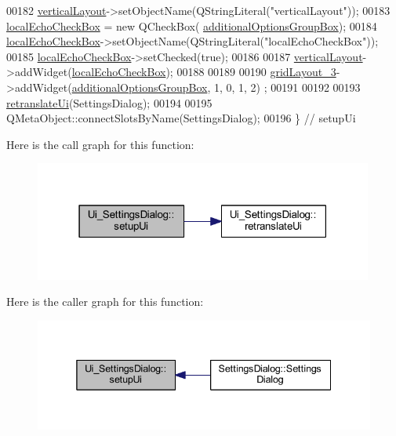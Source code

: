 \begin{DoxyCode}
00182         \hyperlink{a00029_aad19d26806d7e14548233852ac97c26f}{verticalLayout}->setObjectName(QStringLiteral(\textcolor{stringliteral}{"verticalLayout"}));
00183         \hyperlink{a00029_a4cef19b8232e266ba202152ade600263}{localEchoCheckBox} = \textcolor{keyword}{new} QCheckBox(
      \hyperlink{a00029_a996d0cf4818dae895375cb43b996e0dc}{additionalOptionsGroupBox});
00184         \hyperlink{a00029_a4cef19b8232e266ba202152ade600263}{localEchoCheckBox}->setObjectName(QStringLiteral(\textcolor{stringliteral}{"localEchoCheckBox"}));
00185         \hyperlink{a00029_a4cef19b8232e266ba202152ade600263}{localEchoCheckBox}->setChecked(\textcolor{keyword}{true});
00186 
00187         \hyperlink{a00029_aad19d26806d7e14548233852ac97c26f}{verticalLayout}->addWidget(\hyperlink{a00029_a4cef19b8232e266ba202152ade600263}{localEchoCheckBox});
00188 
00189 
00190         \hyperlink{a00029_a2cc53955b73f22f0cfcf508da4654b16}{gridLayout\_3}->addWidget(\hyperlink{a00029_a996d0cf4818dae895375cb43b996e0dc}{additionalOptionsGroupBox}, 1, 0, 1, 2)
      ;
00191 
00192 
00193         \hyperlink{a00029_a7a0adf32eef516ceffcc0633a90c3b34}{retranslateUi}(SettingsDialog);
00194 
00195         QMetaObject::connectSlotsByName(SettingsDialog);
00196     \} \textcolor{comment}{// setupUi}
\end{DoxyCode}


Here is the call graph for this function\+:
\nopagebreak
\begin{figure}[H]
\begin{center}
\leavevmode
\includegraphics[width=316pt]{d5/d16/a00029_a4666ab89748eeb11cdb95d857bd02c6e_cgraph}
\end{center}
\end{figure}




Here is the caller graph for this function\+:
\nopagebreak
\begin{figure}[H]
\begin{center}
\leavevmode
\includegraphics[width=338pt]{d5/d16/a00029_a4666ab89748eeb11cdb95d857bd02c6e_icgraph}
\end{center}
\end{figure}




